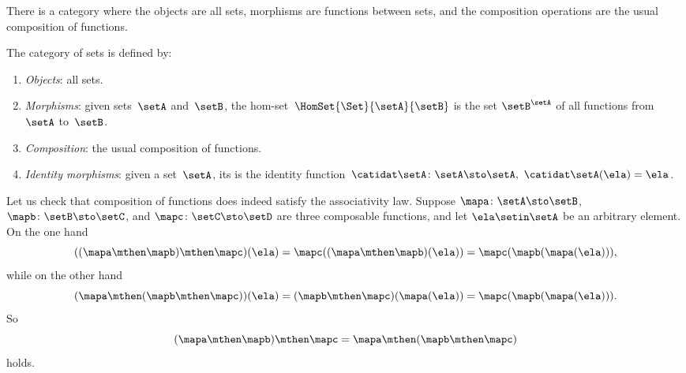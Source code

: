 \begin{example}
    \label{exa:the-category-of-sets}
    There is a category where the objects are all sets, morphisms are functions between sets, and the composition operations are the usual composition of functions.
    
    \begin{ctdefinition}
    \label{def:Set}
    The category \Set of sets is defined by:
    \begin{enumerate}
        \item \emph{Objects}: all sets.
        \item \emph{Morphisms}: given sets~$\setA$ and~$\setB$, the hom-set~$\HomSet{\Set}{\setA}{\setB}$ is the set $\setB^{\setA}$ of all functions from~$\setA$ to~$\setB$.
        \item \emph{Composition}: the usual composition of functions.
        \item \emph{Identity morphisms}: given a set~$\setA$, its  is the identity function~$\catidat\setA \colon \setA \sto \setA, \ \catidat\setA(\ela) = \ela$.
    \end{enumerate}
\end{ctdefinition}

 Let us check that composition of functions does indeed satisfy the associativity law.
    Suppose $\mapa \colon \setA \sto \setB$, $\mapb\colon \setB \sto \setC$, and $\mapc \colon \setC \sto \setD$ are three composable functions, and let $\ela \setin \setA$ be an arbitrary element.
    On the one hand
    \begin{equation}\label{eq:function-associativity-1}
        ((\mapa \mthen \mapb) \mthen \mapc)(\ela) = \mapc((\mapa \mthen \mapb)(\ela)) = \mapc (\mapb (\mapa (\ela))),
    \end{equation}
    while on the other hand
    \begin{equation}\label{eq:function-associativity-2}
        (\mapa \mthen (\mapb \mthen \mapc))(\ela)
        = (\mapb \mthen \mapc)(\mapa(\ela)) = \mapc (\mapb (\mapa (\ela))).
    \end{equation}
    So
    \begin{equation}\label{eq:function-associativity-3}
        (\mapa \mthen \mapb)
        \mthen \mapc = \mapa \mthen (\mapb \mthen \mapc)
    \end{equation}
    holds.
    

\end{example}
